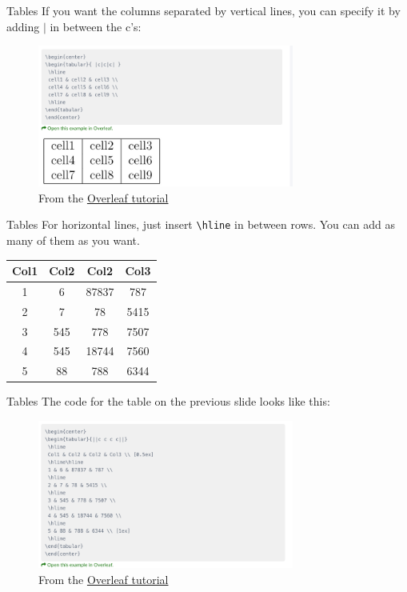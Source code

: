\documentclass{beamer}
\begin{document}
\begin{frame}[fragile]{Tables}
If you want the columns separated by vertical lines, you can specify it by adding $\vert$ in between the c's:\\
\begin{figure}
    \centering
    \includegraphics[width=0.75\textwidth]{tab_vert_bar.png}
    \caption{From the \href{https://www.overleaf.com/learn/latex/Tables}{Overleaf tutorial}}
    \label{fig:table_vertical}
\end{figure}
\end{frame}

\begin{frame}[fragile]{Tables}
For horizontal lines, just insert \verb|\hline| in between rows. You can add as many of them as you want.\\
\begin{center}
\begin{tabular}{||c c c c||} 
 \hline
 Col1 & Col2 & Col2 & Col3 \\ [0.5ex] 
 \hline\hline
 1 & 6 & 87837 & 787 \\ 
 \hline
 2 & 7 & 78 & 5415 \\
 \hline
 3 & 545 & 778 & 7507 \\
 \hline
 4 & 545 & 18744 & 7560 \\
 \hline
 5 & 88 & 788 & 6344 \\ [1ex] 
 \hline
\end{tabular}
\end{center}    
\end{frame}

\begin{frame}{Tables}
The code for the table on the previous slide looks like this:\\
\begin{figure}
    \centering
    \includegraphics[width=0.75\textwidth]{table_complex.png}
    \caption{From the \href{https://www.overleaf.com/learn/latex/Tables}{Overleaf tutorial}}
    \label{fig:table_complex}
\end{figure}
\end{frame}
\end{document}
